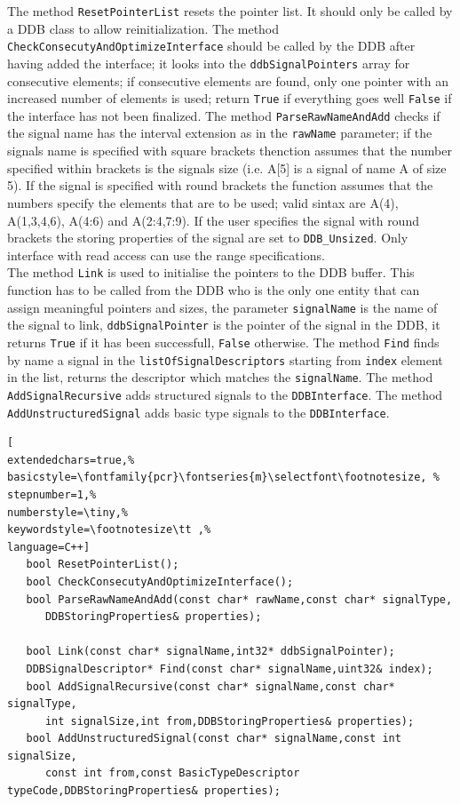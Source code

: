 The method \texttt{ResetPointerList} resets the pointer list. It should only be called by a DDB class to allow reinitialization.
The method \texttt{CheckConsecutyAndOptimizeInterface} should be called by the DDB after having added the interface; it looks into the \texttt{ddbSignalPointers} array for consecutive elements; if consecutive elements are found, only one pointer with an increased number of elements is used; return \texttt{True} if everything goes well \texttt{False} if the interface has not been finalized.
The method \texttt{ParseRawNameAndAdd} checks if the signal name has the interval extension as in the \texttt{rawName} parameter; if the signals name is specified with square brackets thenction assumes that the number specified within brackets is the signals size (i.e. A[5] is a signal of name A of size 5). If the signal is specified with round brackets the function assumes that the numbers specify the elements that are to be used; valid sintax are A(4), A(1,3,4,6), A(4:6) and A(2:4,7:9). If the user specifies the signal with round brackets the storing properties of the signal are set to \texttt{DDB\_Unsized}. Only interface with read access can use the range specifications. \\


The method \texttt{Link} is used to initialise the pointers to the DDB buffer. This function has to be called from the DDB who is the only one entity that can assign meaningful pointers and sizes, the parameter \texttt{signalName} is the name of the signal to link, \texttt{ddbSignalPointer} is the pointer of the signal in the DDB, it returns \texttt{True} if it has been successfull, \texttt{False} otherwise.
The method \texttt{Find} finds by name a signal in the \texttt{listOfSignalDescriptors} starting from \texttt{index} element in the list, returns the descriptor which matches the \texttt{signalName}.
The method \texttt{AddSignalRecursive} adds structured signals to the \texttt{DDBInterface}. The method \texttt{AddUnstructuredSignal} adds basic type signals to the \texttt{DDBInterface}. \\

\begin{lstlisting}[
extendedchars=true,%
basicstyle=\fontfamily{pcr}\fontseries{m}\selectfont\footnotesize, %
stepnumber=1,%
numberstyle=\tiny,%
keywordstyle=\footnotesize\tt ,%
language=C++]
   bool ResetPointerList();
   bool CheckConsecutyAndOptimizeInterface();
   bool ParseRawNameAndAdd(const char* rawName,const char* signalType,
      DDBStoringProperties& properties);

   bool Link(const char* signalName,int32* ddbSignalPointer);
   DDBSignalDescriptor* Find(const char* signalName,uint32& index);
   bool AddSignalRecursive(const char* signalName,const char* signalType,
      int signalSize,int from,DDBStoringProperties& properties);
   bool AddUnstructuredSignal(const char* signalName,const int signalSize,
      const int from,const BasicTypeDescriptor typeCode,DDBStoringProperties& properties);
\end{lstlisting}

